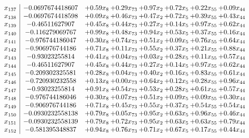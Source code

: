 \documentclass[8pt]{article}
\begin{document}
\[\begin{array}{c| c c@{\hskip 2pt} c@{\hskip 2pt} c@{\hskip 2pt} c@{\hskip 2pt} c@{\hskip 2pt} c@{\hskip 2pt} }
 x_{137}   &  -0.0697674418607 & +  0.59 x_{8} & +  0.29 x_{73} & +  0.97 x_{2} & +  0.72 x_{5} & +  0.22 x_{55} & +  0.09 x_{44}\\
 x_{138}   &  -0.0697674418598 & +  0.09 x_{8} & +  0.46 x_{73} & +  0.47 x_{2} & +  0.72 x_{5} & +  0.39 x_{55} & +  0.43 x_{44}\\
 x_{139}   &  -0.46511627907 & +  0.45 x_{8} & +  0.44 x_{73} & +  0.27 x_{2} & +  0.14 x_{5} & +  0.97 x_{55} & +  0.62 x_{44}\\
 x_{140}   &  -0.116279069767 & +  0.99 x_{8} & +  0.48 x_{73} & +  0.94 x_{2} & +  0.53 x_{5} & +  0.37 x_{55} & +  0.16 x_{44}\\
 x_{141}   &  -0.976744186047 & +  0.30 x_{8} & +  0.74 x_{73} & +  0.51 x_{2} & +  0.09 x_{5} & +  0.76 x_{55} & +  0.64 x_{44}\\
 x_{142}   &  -0.906976744186 & +  0.71 x_{8} & +  0.11 x_{73} & +  0.55 x_{2} & +  0.37 x_{5} & +  0.21 x_{55} & +  0.88 x_{44}\\
 x_{143}   &  -0.93023255814 & +  0.41 x_{8} & +  0.04 x_{73} & +  0.03 x_{2} & +  0.28 x_{5} & +  0.11 x_{55} & +  0.57 x_{44}\\
 x_{144}   &  -0.46511627907 & +  0.45 x_{8} & +  0.44 x_{73} & +  0.27 x_{2} & +  0.14 x_{5} & +  0.97 x_{55} & +  0.62 x_{44}\\
 x_{145}   &  -0.209302325581 & +  0.28 x_{8} & +  0.04 x_{73} & +  0.40 x_{2} & +  0.16 x_{5} & +  0.83 x_{55} & +  0.61 x_{44}\\
 x_{146}   &  -0.720930232558 & +  0.13 x_{8} & +  0.00 x_{73} & +  0.64 x_{2} & +  0.12 x_{5} & +  0.28 x_{55} & +  0.96 x_{44}\\
 x_{147}   &  -0.93023255814 & +  0.91 x_{8} & +  0.54 x_{73} & +  0.53 x_{2} & +  0.28 x_{5} & +  0.61 x_{55} & +  0.57 x_{44}\\
 x_{148}   &  -0.976744186046 & +  0.30 x_{8} & +  0.07 x_{73} & +  0.51 x_{2} & +  0.09 x_{5} & +  0.09 x_{55} & +  0.30 x_{44}\\
 x_{149}   &  -0.906976744186 & +  0.71 x_{8} & +  0.45 x_{73} & +  0.55 x_{2} & +  0.37 x_{5} & +  0.54 x_{55} & +  0.54 x_{44}\\
 x_{150}   &  -0.0930232558138 & +  0.79 x_{8} & +  0.05 x_{73} & +  0.95 x_{2} & +  0.63 x_{5} & +  0.96 x_{55} & +  0.46 x_{44}\\
 x_{151}   &  -0.0930232558139 & +  0.79 x_{8} & +  0.72 x_{73} & +  0.95 x_{2} & +  0.63 x_{5} & +  0.63 x_{55} & +  0.79 x_{44}\\
 x_{152}   &  -0.581395348837 & +  0.94 x_{8} & +  0.76 x_{73} & +  0.71 x_{2} & +  0.67 x_{5} & +  0.17 x_{55} & +  0.44 x_{44}\\

\end{array}\]
\end{document}
